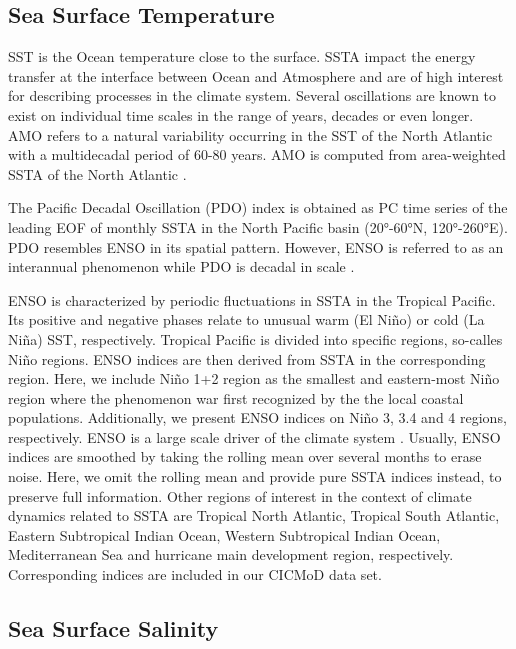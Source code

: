 \documentclass{CUP-JNL-DTM}%
\theoremstyle{definition}
\numberwithin{equation}{section}
\begin{document}
\subsection{Sea Surface Temperature}

SST is the Ocean temperature close to the surface. SSTA impact the energy transfer at the interface between Ocean and Atmosphere and are of high interest for describing processes in the climate system. Several oscillations are known to exist on individual time scales in the range of years, decades or even longer. AMO refers to a natural variability occurring in the SST of the North Atlantic with a multidecadal period of 60-80 years. AMO is computed from area-weighted SSTA of the North Atlantic \cite{Trenberth2006}. 

The Pacific Decadal Oscillation (PDO) index is obtained as PC time series of the leading EOF of monthly SSTA in the North Pacific basin (20°-60°N, 120°-260°E). PDO resembles ENSO in its spatial pattern. However, ENSO is referred to as an interannual phenomenon while PDO is decadal in scale \cite{Trenberth2013}. 

ENSO is characterized by periodic fluctuations in SSTA in the Tropical Pacific. Its positive and negative phases relate to unusual warm (El Ni\~{n}o) or cold (La Ni\~{n}a) SST, respectively. Tropical Pacific is divided into specific regions, so-calles Ni\~{n}o regions. ENSO indices are then derived from SSTA in the corresponding region. Here, we include Ni\~{n}o 1+2 region as the smallest and eastern-most Ni\~{n}o region where the phenomenon war first recognized by the the local coastal populations. Additionally, we present ENSO indices on Ni\~{n}o 3, 3.4 and 4 regions, respectively. ENSO is a large scale driver of the climate system \cite{Philander1989}. Usually, ENSO indices are smoothed by taking the rolling mean over several months to erase noise. Here, we omit the rolling mean and provide pure SSTA indices instead, to preserve full information. Other regions of interest in the context of climate dynamics related to SSTA are Tropical North Atlantic, Tropical South Atlantic, Eastern Subtropical Indian Ocean, Western Subtropical Indian Ocean, Mediterranean Sea and hurricane main development region, respectively. Corresponding indices are included in our CICMoD data set.

\subsection{Sea Surface Salinity}
\end{document}
